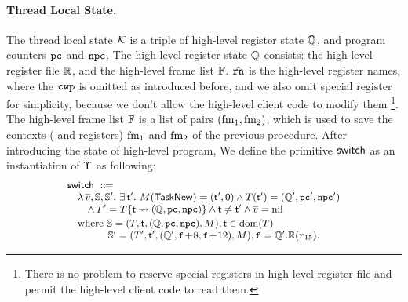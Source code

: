 \paragraph{\textbf{Thread Local State.}} 
The thread local state $\mathcal{K}$ 
is a triple of high-level register state $\mathbb{Q}$, 
and program counters $\texttt{pc}$ and $\texttt{npc}$. The high-level 
register state $\mathbb{Q}$ consists: 
the high-level register file $\mathbb{R}$, 
and the high-level frame list $\mathbb{F}$. 
$\hat{\texttt{rn}}$ is the high-level register names, where 
the $\texttt{cwp}$ is omitted as introduced before,  and 
we also omit special register for simplicity, 
because we don't allow 
the high-level client code to modify them
\footnote{There is no problem to reserve special 
registers in high-level register file and permit
the high-level client code to read them.}. 
The high-level frame list $\mathbb{F}$ is a list of pairs 
$(\text{fm}_1, \text{fm}_2)$, which is used to save 
the contexts (\localRN{} and \inRN{} registers) 
$\text{fm}_1$ and $\text{fm}_2$ of the previous procedure. 
After introducing the state of high-level program, 
We define the primitive $\mathsf{switch}$ as 
an instantiation of $\Upsilon$ as following: 
\[
    \small
    \begin{array}{l}
        \primsw \ \define \\
        \quad 
        \lambda \, \args{\val}, \hpstate, \hpstate'. \ 
        \exists \, \thrdid'. \ 
        \Mem(\TaskNew) = (\thrdid', 0) \land 
        \thrdpool(\thrdid') = 
            (\hRstate', \pc', \npc') \\
        \qquad
        \land \,
        \thrdpool' = \thrdpool\{ \thrdid \rightsquigarrow 
            (\hRstate, \pc, \npc) \} 
            \land \tid \neq \tid' \land \args{\val} = \nil \\
        \\[-9pt]
        \quad \text{where} \ 
        \hpstate = 
            (\thrdpool, \thrdid, (\hRstate, \pc, \npc), \Mem), 
        \tid \in \dom(\thrdpool) \\
        \qquad\qquad
        \hpstate' = 
            (\thrdpool', \thrdid', 
                (\hRstate', \lab{}\!+\!8, \lab{}\!+\!12), \Mem), 
                \lab{} = \hRstate'.\hRfile(\reg{15}). 
    \end{array}
\]
